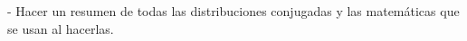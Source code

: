 \documentclass[../Main/Main.tex]{subfiles}
\begin{document}
- Hacer un resumen de todas las distribuciones conjugadas y las matemáticas que se usan al hacerlas.
\end{document}

